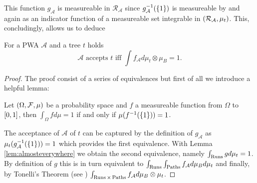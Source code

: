 This function $g_{\mathcal{A}}$ is measureable in $\mathcal{R}_{\mathcal{A}}$
since $g_{\mathcal{A}}^{-1}(\left\{1\right\})$ is measureable by \cite[Lemma 23.1]{Bauer}
and again as an indicator function of a measureable set integrable in
$\left(\mathcal{R}_{\mathcal{A}},\mu_{t}\right)$. This, concludingly, allows us to
deduce
\begin{proposition}
  For a \ac{PWA} $\mathcal{A}$ and a tree $t$ holds
  \begin{equation*}
    \mathcal{A}\text{ accepts }t\text{ iff }\int f_{\mathcal{A}} d\mu_{t}\otimes\mu_{B} = 1.
  \end{equation*}
\end{proposition}
\begin{proof}
  The proof consist of a series of equivalences but first of all we introduce
  a helpful lemma:
  \begin{lemma}
    \cite[Lemma 40]{RandAutoInfTrees} Let $\left(\Omega,\mathcal{F},\mu\right)$ be
    a probability space and $f$ a measureable function from $\Omega$ to
    $\left[0,1\right]$, then $\int_{\Omega}f d\mu = 1$ if and only if 
    $\mu(f^{-1}(\left\{1\right\})) = 1$.
    \label{lem:almosteverywhere}
  \end{lemma}
  The acceptance of $\mathcal{A}$ of $t$ can be captured by the definition of
  $g_{\mathcal{A}}$ as $\mu_{t}(g_{\mathcal{A}}^{-1}(\left\{1\right\})) = 1$ which
  provides the first equivalence. With Lemma \ref{lem:almosteverywhere} we
  obtain the second equivalence, namely $\int_{\operatorname{Runs}} g d\mu_{t} = 1$. By
  definition of $g$ this is in turn equivalent to
  $\int_{\operatorname{Runs}}\int_{\operatorname{Paths}} f_{\mathcal{A}} d\mu_{B} d\mu_{t}$ and finally, by
  Tonelli's Theorem (see \cite[Theorem 23.6]{Bauer})
  $\int_{\operatorname{Runs}\times\operatorname{Paths}}f_{\mathcal{A}}d\mu_{B}\otimes\mu_{t}$.
\end{proof}
